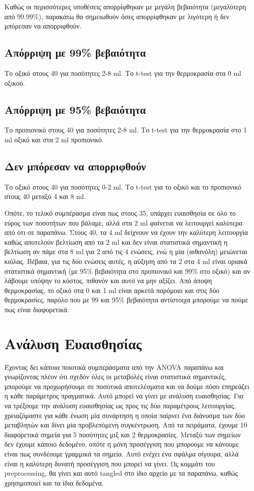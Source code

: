 \documentclass[11pt]{article}
\begin{document}
Καθώς οι περισσότερες υποθέσεις απορρίφθηκαν με μεγάλη βεβαιότητα (μεγαλύτερη από 99.99\%), παρακάτω θα σημειωθούν όσες απορρίφθηκαν με λιγότερη ή δεν μπόρεσαν να απορριφθούν.

\subsection{Απόρριψη με 99\% βεβαιότητα}
\label{sec:org0f18935}
Το οξικό στους 40 για ποσότητες 2-8 ml.
Το t-test για την θερμοκρασία στα 0 ml οξικού.

\subsection{Απόρριψη με 95\% βεβαιότητα}
\label{sec:orgdf394ff}
Το προπιονικό στους 40 για ποσότητες 2-8 ml.
Το t-test για την θερμοκρασία στο 1 ml οξικό και στα 2 ml προπιονικό.

\subsection{Δεν μπόρεσαν να απορριφθούν}
\label{sec:org4557597}
Το οξικό στους 40 για ποσότητες 0-2 ml.
Το t-test για το οξικό και το προπιονικό στους 40 μεταξύ 4 και 8 ml.

Οπότε, το τελικό συμπέρασμα είναι πως στους 35, υπάρχει ευαισθησία σε όλο το εύρος των ποσοτήτων που βάλαμε, αλλά στα 2 ml φαίνεται να λειτουργεί καλύτερα από ότι σε παραπάνω. Στους 40, τα 4 ml δείχνουν να έχουν την καλύτερη λειτουργία καθώς αποτελούν βελτίωση από τα 2 ml και δεν είναι στατιστικά σημαντική η βελτίωση αν πάμε στα 8 ml για 2 από τις 4 ενώσεις, ενώ η μία (αιθανόλη) μειώνεται κιόλας. Βέβαια, για τις δύο ενώσεις αυτές, η αύξηση από τα 2 στα 4 ml είναι οριακά στατιστικά σημαντική (με 95\% βεβαιότητα στο προπιονικό και 99\% στο οξικό) και αν λάβουμε υπόψην το κόστος, πιθανόν και αυτό να μην αξίζει. Από άποψη θερμοκρασίας, το οξικό στα 0 και 1 ml είναι αρκετά παρόμοιο και στις δύο θερμοκρασίες, παρόλο που με 99 και 95\% βεβαιότητα αντίστοιχα μπορούμε να πούμε πως είναι διαφορετικά. 

\section{Ανάλυση Ευαισθησίας}
\label{sec:orga5b2a11}
Έχοντας δει κάποια ποιοτικά συμπεράσματα από την ANOVA παραπάνω και γνωρίζοντας πλέον ότι σχεδόν όλες οι μεταβολές είναι στατιστικά σημαντικές, μπορούμε να προχωρήσουμε σε ποσοτικά αποτελέσματα και να δούμε πόσο επηρεάζει η κάθε παράμετρος πραγματικά. Αυτό μπορεί να γίνει με ανάλυση ευαισθησίας. Για να τρέξουμε την ανάλυση ευαισθησίας ως προς τις δύο παραμέτρους λειτουργίας, χρειαζόμαστε για κάθε ένωση μία συνάρτηση η οποία παίρνει ένα διάνυσμα των δύο μεταβλητών και δίνει μία προβλεπόμενη συγκέντρωση. Από τα πειράματα, έχουμε 10 διαφορετικά σημεία για 5 ποσότητες μιξ και 2 θερμοκρασίες. Μεταξύ των σημείων δεν έχουμε κάποιο δεδομένο, οπότε η μόνη προσέγγιση που μπορούμε να κάνουμε είναι πως συνδέουμε γραμμικά τα σημεία. Αυτό ενέχει ένα σφάλμα σίγουρα, αλλά είναι η καλύτερη δυνατή προσέγγιση που μπορεί να γίνει. Ως κομμάτι του preprocessing, θα γίνει και αυτό tangled στο ίδιο αρχείο με τα παραπάνω, καθώς χρησιμοποιεί και τα ίδια δεδομένα.
\end{document}
